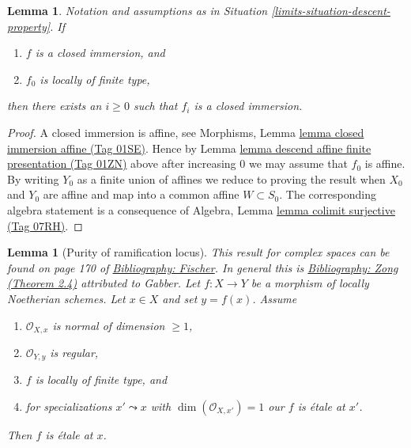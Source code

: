 \documentclass{amsart}
\newenvironment{reference}{\comment}{\endcomment}
\theoremstyle{plain}
\newtheorem{lemma}[subsection]{Lemma}
\theoremstyle{definition}
\theoremstyle{remark}
\numberwithin{equation}{subsection}
\begin{document}
\begin{lemma}
\label{limits-lemma-descend-closed-immersion-finite-presentation}
Notation and assumptions as in Situation \ref{limits-situation-descent-property}.
If
\begin{enumerate}
\item $f$ is a closed immersion, and
\item $f_0$ is locally of finite type,
\end{enumerate}
then there exists an $i \geq 0$ such that $f_i$ is a closed immersion.
\end{lemma}

\begin{proof}
A closed immersion is affine, see
Morphisms, Lemma \href{https://stacks.math.columbia.edu/tag/01SE}{lemma closed immersion affine (Tag 01SE)}.
Hence by Lemma \href{https://stacks.math.columbia.edu/tag/01ZN}{lemma descend affine finite presentation (Tag 01ZN)} above
after increasing $0$ we may assume that $f_0$ is affine.
By writing $Y_0$ as a finite union of affines we reduce to proving
the result when $X_0$ and $Y_0$ are affine and map
into a common affine $W \subset S_0$. The corresponding algebra
statement is a consequence of
Algebra, Lemma \href{https://stacks.math.columbia.edu/tag/07RH}{lemma colimit surjective (Tag 07RH)}.
\end{proof}


\begin{lemma}[Purity of ramification locus]
\label{lemma-purity-ramification}
\begin{reference}
This result for complex spaces can be found on page 170 of \href{https://stacks.math.columbia.edu/bibliography}{Bibliography: Fischer}.
In general this is \href{https://stacks.math.columbia.edu/bibliography}{Bibliography: Zong (Theorem 2.4)} attributed to Gabber.
\end{reference}
Let $f : X \to Y$ be a morphism of locally Noetherian schemes.
Let $x \in X$ and set $y = f(x)$. Assume
\begin{enumerate}
\item $\mathcal{O}_{X, x}$ is normal of dimension $\geq 1$,
\item $\mathcal{O}_{Y, y}$ is regular,
\item $f$ is locally of finite type, and
\item for specializations $x' \leadsto x$ with
$\dim(\mathcal{O}_{X, x'}) = 1$ our $f$ is \'etale at $x'$.
\end{enumerate}
Then $f$ is \'etale at $x$.
\end{lemma}
\end{document}
